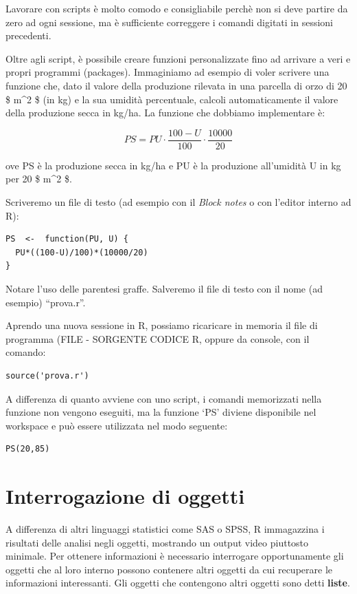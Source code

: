 \documentclass[a4paper,12pt,oneside]{book}
\theoremstyle{definition}
\theoremstyle{definition}
\theoremstyle{definition}
\theoremstyle{remark}
\begin{document}
Lavorare con scripts è molto comodo e consigliabile perchè non si deve
partire da zero ad ogni sessione, ma è sufficiente correggere i comandi
digitati in sessioni precedenti.

Oltre agli script, è possibile creare funzioni personalizzate fino ad
arrivare a veri e propri programmi (packages). Immaginiamo ad esempio di
voler scrivere una funzione che, dato il valore della produzione
rilevata in una parcella di orzo di 20 \$ m\^{}2 \$ (in kg) e la sua
umidità percentuale, calcoli automaticamente il valore della produzione
secca in kg/ha. La funzione che dobbiamo implementare è:

\[
PS = PU \cdot \frac{100 - U}{100} \cdot \frac{10000}{20}
\]

ove PS è la produzione secca in kg/ha e PU è la produzione all'umidità U
in kg per 20 \$ m\^{}2 \$.

Scriveremo un file di testo (ad esempio con il \emph{Block notes} o con
l'editor interno ad R):

\begin{verbatim}
PS  <-  function(PU, U) {
  PU*((100-U)/100)*(10000/20)
}
\end{verbatim}

Notare l'uso delle parentesi graffe. Salveremo il file di testo con il
nome (ad esempio) ``prova.r''.

Aprendo una nuova sessione in R, possiamo ricaricare in memoria il file
di programma (FILE - SORGENTE CODICE R, oppure da console, con il
comando:

\begin{verbatim}
source('prova.r')
\end{verbatim}

A differenza di quanto avviene con uno script, i comandi memorizzati
nella funzione non vengono eseguiti, ma la funzione `PS' diviene
disponibile nel workspace e può essere utilizzata nel modo seguente:

\begin{verbatim}
PS(20,85)
\end{verbatim}

\section*{Interrogazione di oggetti}\label{interrogazione-di-oggetti}

A differenza di altri linguaggi statistici come SAS o SPSS, R
immagazzina i risultati delle analisi negli oggetti, mostrando un output
video piuttosto minimale. Per ottenere informazioni è necessario
interrogare opportunamente gli oggetti che al loro interno possono
contenere altri oggetti da cui recuperare le informazioni interessanti.
Gli oggetti che contengono altri oggetti sono detti \textbf{liste}.
\end{document}

